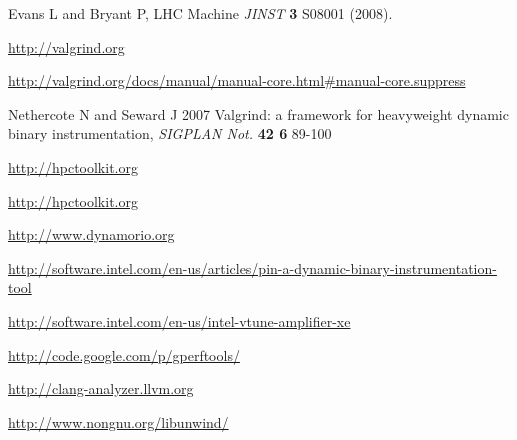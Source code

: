 \documentclass[notitlepage,letter,12pt]{article}
\begin{document}
\begin{thebibliography}{0}
 Evans L and Bryant P,  LHC Machine {\it JINST} {\bf 3} S08001 (2008).







 \url{http://valgrind.org}

 \url{http://valgrind.org/docs/manual/manual-core.html\#manual-core.suppress}

 Nethercote N and Seward J 2007 Valgrind: a framework for heavyweight dynamic binary instrumentation, {\it SIGPLAN Not.} {\bf 42 6} 89-100

 \url{http://hpctoolkit.org}

 \url{http://hpctoolkit.org}

 \url{http://www.dynamorio.org}

 \url{http://software.intel.com/en-us/articles/pin-a-dynamic-binary-instrumentation-tool}

 \url{http://software.intel.com/en-us/intel-vtune-amplifier-xe}

 \url{http://code.google.com/p/gperftools/}

 \url{http://clang-analyzer.llvm.org}


 \url{http://www.nongnu.org/libunwind/}

\end{thebibliography}
\end{document}
